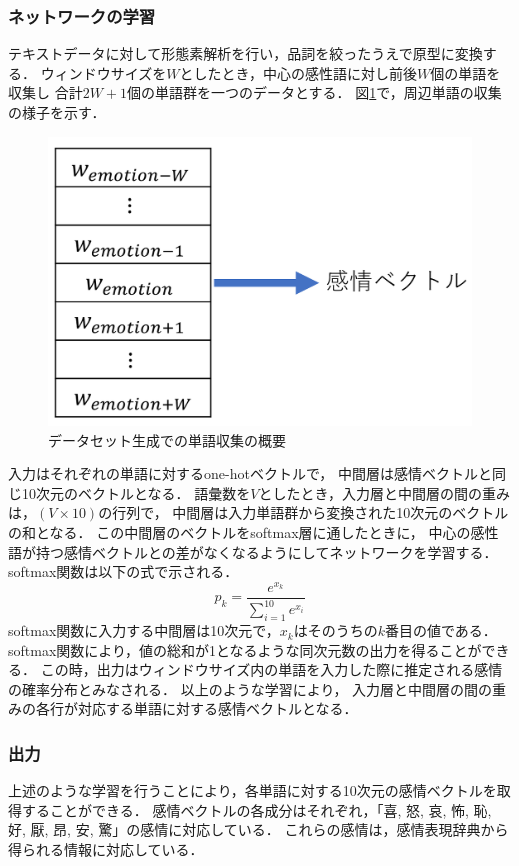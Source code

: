 		\subsubsection{ネットワークの学習}
		テキストデータに対して形態素解析を行い，品詞を絞ったうえで原型に変換する．
		ウィンドウサイズを$W$としたとき，中心の感性語に対し前後$W$個の単語を収集し
		合計$2W+1$個の単語群を一つのデータとする．
		図\ref{fig:takeuchi_dataset}で，周辺単語の収集の様子を示す．
		\begin{figure}[H]
			\centering
			\includegraphics[width=\linewidth]{./figure/takeuchi_dataset.png}
			\caption{データセット生成での単語収集の概要}
			\label{fig:takeuchi_dataset}
		\end{figure}
		入力はそれぞれの単語に対するone-hotベクトルで，
		中間層は感情ベクトルと同じ10次元のベクトルとなる．
		語彙数を$V$としたとき，入力層と中間層の間の重みは，$(V \times 10)$の行列で，
		中間層は入力単語群から変換された10次元のベクトルの和となる．
		この中間層のベクトルをsoftmax層に通したときに，
		中心の感性語が持つ感情ベクトルとの差がなくなるようにしてネットワークを学習する．
		softmax関数は以下の式で示される．
		\begin{equation}
			p_k = \frac{e^{x_k}}{\sum_{i=1}^{10}e^{x_i}}
		\end{equation}
		softmax関数に入力する中間層は10次元で，$x_k$はそのうちの$k$番目の値である．
		softmax関数により，値の総和が1となるような同次元数の出力を得ることができる．
		この時，出力はウィンドウサイズ内の単語を入力した際に推定される感情の確率分布とみなされる．
		以上のような学習により，
		入力層と中間層の間の重みの各行が対応する単語に対する感情ベクトルとなる．

		\subsubsection{出力}
		上述のような学習を行うことにより，各単語に対する10次元の感情ベクトルを取得することができる．
		感情ベクトルの各成分はそれぞれ，「喜, 怒, 哀, 怖, 恥, 好, 厭, 昂, 安, 驚」の感情に対応している．
		これらの感情は，感情表現辞典から得られる情報に対応している．

